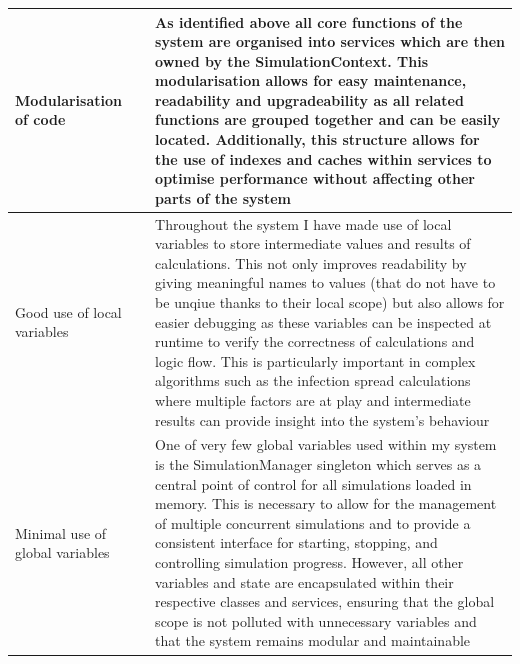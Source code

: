 \begin{longtable}{|L{3.5cm}|L{4.5cm}|L{5.5cm}|}
Modularisation of code & 
 & As identified above all core functions of the system are organised into services which are then owned by the SimulationContext. This modularisation allows for easy maintenance, readability and upgradeability as all related functions are grouped together and can be easily located. Additionally, this structure allows for the use of indexes and caches within services to optimise performance without affecting other parts of the system\\
\hline

Good use of local variables & 
& 
Throughout the system I have made use of local variables to store intermediate values and results of calculations. This not only improves readability by giving meaningful names to values (that do not have to be unqiue thanks to their local scope) but also allows for easier debugging as these variables can be inspected at runtime to verify the correctness of calculations and logic flow. This is particularly important in complex algorithms such as the infection spread calculations where multiple factors are at play and intermediate results can provide insight into the system's behaviour\\
\hline

Minimal use of global variables & 
 & 
One of very few global variables used within my system is the SimulationManager singleton which serves as a central point of control for all simulations loaded in memory. This is necessary to allow for the management of multiple concurrent simulations and to provide a consistent interface for starting, stopping, and controlling simulation progress. However, all other variables and state are encapsulated within their respective classes and services, ensuring that the global scope is not polluted with unnecessary variables and that the system remains modular and maintainable\\
\hline


\end{longtable}
